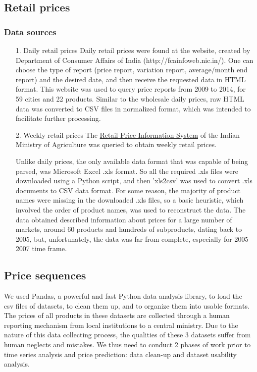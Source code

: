 \subsection*{Retail prices}
\subsubsection*{Data sources}

\begin{itemize}
\item[1.] Daily retail prices
Daily retail prices were found at the website, created by Department of Consumer Affairs of India (http://fcainfoweb.nic.in/). One can choose the type of report (price report, variation report, average/month end report) and the desired date, and then receive the requested data in HTML format. This website was used to query price reports from 2009 to 2014, for 59 cities and 22 products. Similar to the wholesale daily prices, raw HTML data was converted to CSV files in normalized format, which was intended to facilitate further processing.

\item[2.] Weekly retail prices
The \href{http://rpms.dacnet.nic.in/}{Retail Price Information System} of the Indian Ministry of Agriculture was queried to obtain weekly retail prices.\par
Unlike daily prices, the only available data format that was capable of being parsed, was Microsoft Excel .xls format. So all the required .xls files were downloaded using a Python script, and then 'xls2csv' was used to convert .xls documents to CSV data format. For some reason, the majority of product names were missing in the downloaded .xls files, so a basic heuristic, which involved the order of product names, was used to reconstruct the data.
The data obtained described information about prices for a large number of markets, around 60 products and hundreds of subproducts, dating back to 2005, but, unfortunately, the data was far from complete, especially for 2005-2007 time frame.
\end{itemize}

\subsection*{Price sequences}
We used Pandas, a powerful and fast Python data analysis library, to load the csv files of datasets, to clean them up, and to organize them into usable formats. The prices of all products in these datasets are collected through a human reporting mechanism from local institutions to a central ministry. Due to the nature of this data collecting process, the qualities of these 3 datasets suffer from human neglects and mistakes. We thus need to conduct 2 phases of work prior to time series analysis and price prediction: data clean-up and dataset usability analysis.

